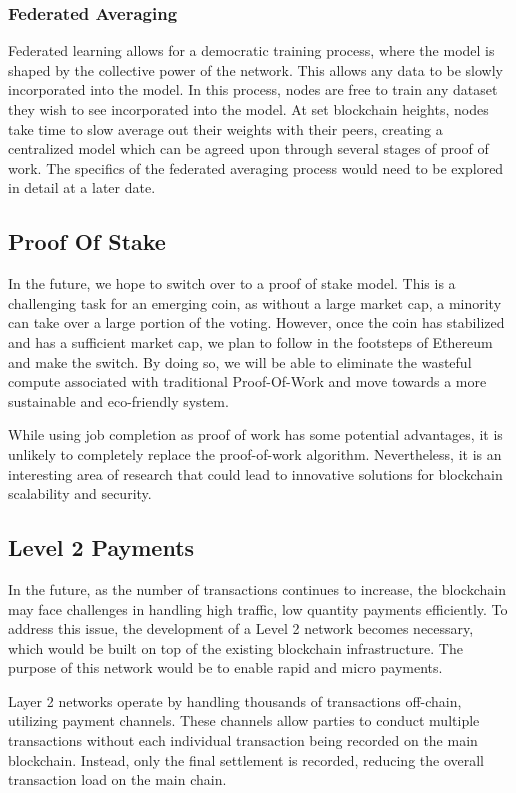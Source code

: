 \documentclass{article}
\begin{document}
\subsubsection {Federated Averaging}
Federated learning allows for a democratic training process, where the model is shaped by the collective power of the network. 
This allows any data to be slowly incorporated into the model. 
In this process, nodes are free to train any dataset they wish to see incorporated into the model. At set blockchain heights, nodes take time to slow average out their weights with their peers, creating a centralized model which can be agreed upon through several stages of proof of work. 
The specifics of the federated averaging process would need to be explored in detail at a later date.

\subsection{Proof Of Stake}

In the future, we hope to switch over to a proof of stake model. 
This is a challenging task for an emerging coin, as without a large market cap, a minority can take over a large portion of the voting. 
However, once the coin has stabilized and has a sufficient market cap, we plan to follow in the footsteps of Ethereum and make the switch. 
By doing so, we will be able to eliminate the wasteful compute associated with traditional Proof-Of-Work and move towards a more sustainable and eco-friendly system.

While using job completion as proof of work has some potential advantages, it is unlikely to completely replace the proof-of-work algorithm. 
Nevertheless, it is an interesting area of research that could lead to innovative solutions for blockchain scalability and security.

\subsection{Level 2 Payments}
In the future, as the number of transactions continues to increase, the blockchain may face challenges in handling high traffic, low quantity payments efficiently. 
To address this issue, the development of a Level 2 network becomes necessary, which would be built on top of the existing blockchain infrastructure. 
The purpose of this network would be to enable rapid and micro payments.

Layer 2 networks operate by handling thousands of transactions off-chain, utilizing payment channels. 
These channels allow parties to conduct multiple transactions without each individual transaction being recorded on the main blockchain. 
Instead, only the final settlement is recorded, reducing the overall transaction load on the main chain.
\end{document}
